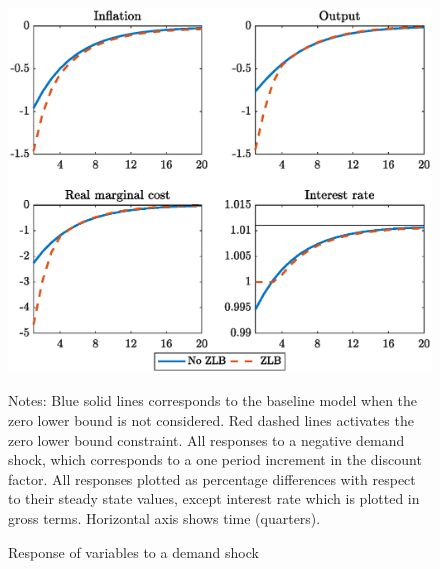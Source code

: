\documentclass[11pt]{article}
\numberwithin{equation}{section}
\begin{document}
\begin{figure}[H]
	\centering
	\caption{Response of variables to a demand shock}\label{fig:irfLevel_pref}
	\includegraphics[scale=.6]{irfLevel_pref}
	\begin{minipage}{\linewidth}
    	\vspace{1mm}
	\footnotesize{{\sc Notes:} Blue solid lines corresponds to the baseline model when the zero lower bound is not considered. Red dashed lines activates the zero lower bound constraint. All responses to a negative demand shock, which corresponds to a one period increment in the discount factor. All responses plotted as percentage differences with respect to their steady state values, except interest rate which is plotted in gross terms. Horizontal axis shows time (quarters).}
	\end{minipage}
\end{figure}
\end{document}
